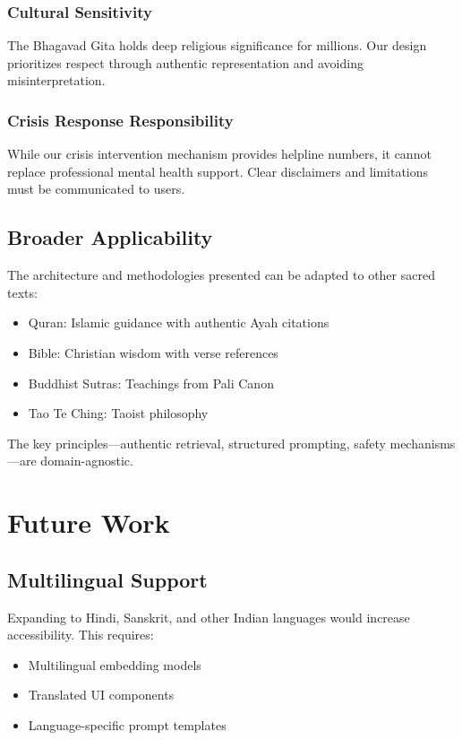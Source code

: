 \documentclass[conference]{IEEEtran}
\begin{document}
\subsubsection{Cultural Sensitivity}
The Bhagavad Gita holds deep religious significance for millions. Our design prioritizes respect through authentic representation and avoiding misinterpretation.

\subsubsection{Crisis Response Responsibility}
While our crisis intervention mechanism provides helpline numbers, it cannot replace professional mental health support. Clear disclaimers and limitations must be communicated to users.

\subsection{Broader Applicability}

The architecture and methodologies presented can be adapted to other sacred texts:

\begin{itemize}
    \item Quran: Islamic guidance with authentic Ayah citations
    \item Bible: Christian wisdom with verse references
    \item Buddhist Sutras: Teachings from Pali Canon
    \item Tao Te Ching: Taoist philosophy
\end{itemize}

The key principles—authentic retrieval, structured prompting, safety mechanisms—are domain-agnostic.


\section{Future Work}

\subsection{Multilingual Support}
Expanding to Hindi, Sanskrit, and other Indian languages would increase accessibility. This requires:
\begin{itemize}
    \item Multilingual embedding models
    \item Translated UI components
    \item Language-specific prompt templates
\end{itemize}
\end{document}
